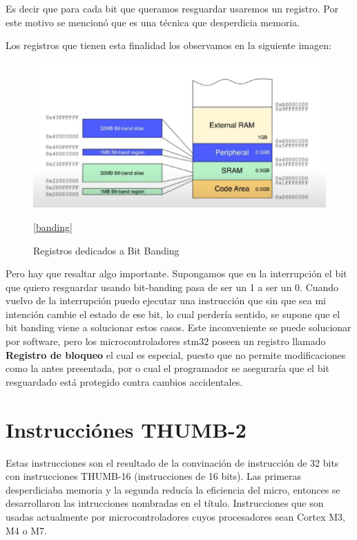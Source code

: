 \documentclass[a4paper,12pt]{report} %
\begin{document}
Es decir que para cada bit que queramos resguardar usaremos un registro. Por este motivo se mencionó que es una técnica que desperdicia memoria.

Los registros que tienen esta finalidad los observamos en la siguiente imagen: 

\begin{figure}[H]
	\centering
	\includegraphics[scale=0.5]{Imagenes/stm/reg_banding}
	\caption{Registros dedicados a Bit Banding}
	\ref{banding}
\end{figure}

Pero hay que resaltar algo importante. Supongamos que en la interrupción el bit que quiero resguardar usando bit-banding pasa de ser un 1 a ser un 0. Cuando vuelvo de la interrupción puedo ejecutar una instrucción que sin que sea mi intención cambie el estado de ese bit, lo cual perdería sentido, se supone que el bit banding viene a solucionar estos casos. Este inconveniente se puede solucionar por software, pero los microcontroladores stm32 poseen un registro llamado \textbf{Registro de bloqueo} el cual es especial, puesto que no permite modificaciones como la antes presentada, por o cual el programador se aseguraría que el bit resguardado está protegido contra cambios accidentales.

\section{Instrucciónes THUMB-2}

Estas instrucciones son el resultado de la convinación de instrucción de 32 bits con instrucciones THUMB-16 (instrucciones de 16 bits). Las primeras desperdiciaba memoria y la segunda reducía la eficiencia del micro, entonces se desarrollaron las intrucciones nombradas en el título. Instrucciones que son usadas actualmente por microcontroladores cuyos procesadores sean Cortex M3, M4 o M7.
\end{document}
